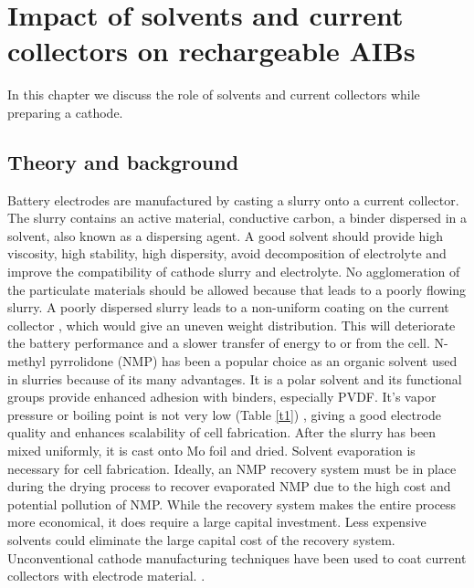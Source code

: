 
\chapter{Impact of solvents and current collectors on rechargeable AIBs} %
In this chapter we discuss the role of solvents and current collectors while preparing a cathode. 
\label{chap7} %


\newcommand{\keyword}[1]{\textbf{#1}}
\newcommand{\tabhead}[1]{\textbf{#1}}
\newcommand{\code}[1]{\texttt{#1}}
\newcommand{\file}[1]{\texttt{\bfseries#1}}
\newcommand{\option}[1]{\texttt{\itshape#1}}

\section{Theory and background}
Battery electrodes are manufactured by casting a slurry onto a current collector. The slurry contains an active material, conductive carbon, a binder dispersed in a solvent, also known as a dispersing agent. A good solvent should provide high viscosity, high stability, high dispersity, avoid decomposition of electrolyte and improve the compatibility of cathode slurry and electrolyte\cite{ludwig_solvent-free_2016}. No agglomeration of the particulate materials should be allowed because that leads to a poorly flowing slurry. A poorly dispersed slurry leads to a non-uniform coating on the current collector , which would give an uneven weight distribution. This will deteriorate the battery performance and a slower transfer of energy to or from the cell. N-methyl pyrrolidone (NMP) has been a popular choice as an organic solvent used in slurries because of its many advantages. It is a polar solvent and its functional groups provide enhanced adhesion with binders, especially PVDF. It's vapor pressure or boiling point is not very low (Table \ref{t1}) , giving a good electrode quality and enhances scalability of cell fabrication. 
After the slurry has been mixed uniformly, it is cast onto Mo foil and dried. Solvent evaporation is necessary for cell fabrication. Ideally, an NMP recovery system must be in place during the drying process to recover evaporated NMP due to the high cost and potential pollution of NMP. While the recovery system makes the entire process more economical, it does require a large capital investment. Less expensive solvents could eliminate the large capital cost of the recovery system. Unconventional cathode manufacturing techniques have been used to coat current collectors with electrode material. \cite{liu_effective_2014-1,spreafico_pvdf_2014-1, liu_effects_2008-1, lee_effect_2010-1, wenzel_challenges_2015}.
